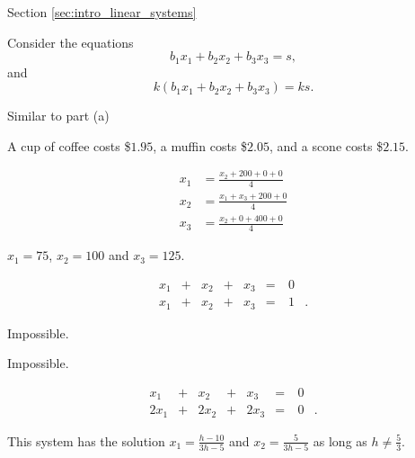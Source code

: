  \label{sec:answers}

\begin{multicols}{2}
Section \ref{sec:intro_linear_systems}
\obe
\item 
\ba
\item Consider the equations 
\[b_1x_1+b_2x_2 + b_3x_3 = s,\]
and
\[k(b_1x_1+b_2x_2 + b_3x_3) = ks.\]

\item Similar to part (a)

\ea


\item A cup of coffee costs \$$1.95$, a muffin costs \$$2.05$, and a scone costs \$$2.15$. 


\item
\ba
\item 
\begin{align*}
x_1 &= \frac{x_2+200+0+0}{4} \\
x_2 &= \frac{x_1+x_3+200+0}{4} \\
x_3 &= \frac{x_2+0+400+0}{4}
\end{align*}

\item $x_1 = 75$, $x_2 = 100$ and $x_3 = 125$. 

\ea


\item 
\ba
	\item 
\begin{alignat*}{5}
{}x_1 	&{}+{}	&{}x_2	&{}+{}	&{}x_3	&= &\ 0&{}  \\ 
{}x_1 	&{}+{}	&{}x_2	&{}+{}	&{}x_3	&= &\ 1&{.}   
\end{alignat*}

	\item Impossible. 
	
	\item Impossible. 
	
	\item 
\begin{alignat*}{5}
{}x_1 	&{}+{}	&{}x_2	&{}+{}	&{}x_3	&= & \ 0&{}  \\ 
{2}x_1 	&{}+{}	&{2}x_2	&{}+{}	&{2}x_3	&= & \ 0&{.}   
\end{alignat*}

	\ea
			
\item 
\ba
\item This system has the solution $x_1 =  \frac{h-10}{3h-5}$ and $x_2 = \frac{5}{3h-5}$ as long as $h \neq \frac{5}{3}$. 


\end{multicols}
